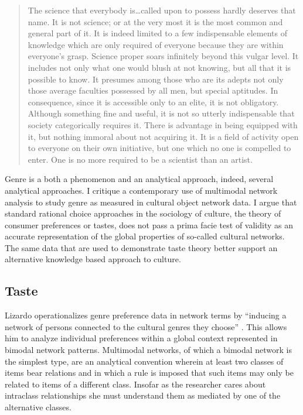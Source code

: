 \documentclass[]{book}
\theoremstyle{definition}
\theoremstyle{definition}
\theoremstyle{definition}
\theoremstyle{remark}
\begin{document}
\begin{quote}
The science that everybody is\ldots called upon to possess hardly
deserves that name. It is not science; or at the very most it is the
most common and general part of it. It is indeed limited to a few
indispensable elements of knowledge which are only required of everyone
because they are within everyone's grasp. Science proper soars
infinitely beyond this vulgar level. It includes not only what one would
blush at not knowing, but all that it is possible to know. It presumes
among those who are its adepts not only those average faculties
possessed by all men, but special aptitudes. In consequence, since it is
accessible only to an elite, it is not obligatory. Although something
fine and useful, it is not so utterly indispensable that society
categorically requires it. There is advantage in being equipped with it,
but nothing immoral about not acquiring it. It is a field of activity
open to everyone on their own initiative, but one which no one is
compelled to enter. One is no more required to be a scientist than an
artist. \citep[43]{Durkheim1893division}
\end{quote}

Genre is a both a phenomenon and an analytical approach, indeed, several
analytical approaches. I critique a contemporary use of multimodal
network analysis to study genre as measured in cultural object network
data. I argue that standard rational choice approaches in the sociology
of culture, the theory of consumer preferences or tastes, does not pass
a prima facie test of validity as an accurate representation of the
global properties of so-called cultural networks. The same data that are
used to demonstrate taste theory better support an alternative knowledge
based approach to culture.

\hypertarget{taste}{%
\subsection{Taste}\label{taste}}

Lizardo operationalizes genre preference data in network terms by
``inducing a network of persons connected to the cultural genres they
choose'' \citeyearpar[53]{Lizardo2018mutual}. This allows him to analyze
individual preferences within a global context represented in bimodal
network patterns. Multimodal networks, of which a bimodal network is the
simplest type, are an analytical convention wherein at least two classes
of items bear relations and in which a rule is imposed that such items
may only be related to items of a different class. Insofar as the
researcher cares about intraclass relationships she must understand them
as mediated by one of the alternative classes.
\end{document}
